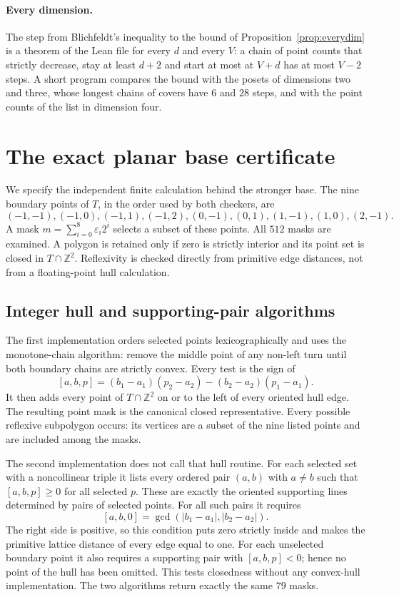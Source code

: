 \documentclass[manuscript]{aomart}
\theoremstyle{definition}
\theoremstyle{remark}
\newcommand{\Z}{\mathbb{Z}}
\begin{document}
\paragraph*{Every dimension.} The step from Blichfeldt's inequality to the
bound of Proposition~\ref{prop:everydim} is a theorem of the Lean file for
every $d$ and every $V$: a chain of point counts that strictly decrease,
stay at least $d+2$ and start at most at $V+d$ has at most $V-2$ steps. A
short program compares the bound with the posets of dimensions two and
three, whose longest chains of covers have $6$ and $28$ steps, and with the
point counts of the list in dimension four.

\section{The exact planar base certificate}\label{app:fs-cert}
We specify the independent finite calculation behind the stronger base.
The nine boundary points of $T$, in the order used by both checkers, are
\[
 (-1,-1),(-1,0),(-1,1),(-1,2),(0,-1),(0,1),(1,-1),(1,0),(2,-1).
\]
A mask $m=\sum_{i=0}^8\varepsilon_i2^i$ selects a subset of these points.
All $512$ masks are examined. A polygon is retained only if zero is
strictly interior and its point set is closed in $T\cap\Z^2$.
Reflexivity is checked directly from primitive edge distances, not from
a floating-point hull calculation.

\subsection{Integer hull and supporting-pair algorithms}
The first implementation orders selected points lexicographically and
uses the monotone-chain algorithm: remove the middle point of any
non-left turn until both boundary chains are strictly convex. Every
test is the sign of
\[
 [a,b,p]=(b_1-a_1)(p_2-a_2)-(b_2-a_2)(p_1-a_1).
\]
It then adds every point of $T\cap\Z^2$ on or to the left of every
oriented hull edge. The resulting point mask is the canonical closed
representative. Every possible reflexive subpolygon occurs: its vertices
are a subset of the nine listed points and are included among the masks.

The second implementation does not call that hull routine. For each
selected set with a noncollinear triple it lists every ordered pair
$(a,b)$ with $a\ne b$ such that $[a,b,p]\ge0$ for all selected $p$.
These are exactly the oriented supporting lines determined by pairs of
selected points. For all such pairs it requires
\[
 [a,b,0]=\gcd(|b_1-a_1|,|b_2-a_2|).
\]
The right side is positive, so this condition puts zero strictly inside
and makes the primitive lattice distance of every edge equal to one.
For each unselected boundary point it also requires a supporting pair
with $[a,b,p]<0$; hence no point of the hull has been omitted. This
tests closedness without any convex-hull implementation. The two
algorithms return exactly the same $79$ masks.
\end{document}
